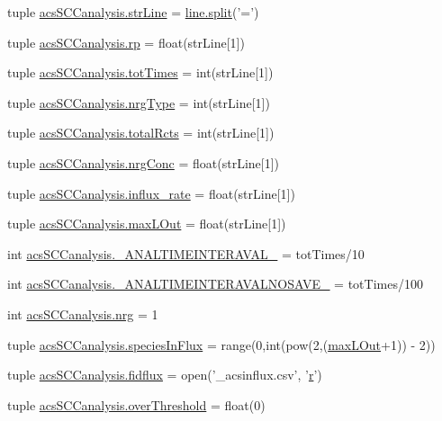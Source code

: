 \begin{DoxyCompactItemize}
\item 
tuple \hyperlink{a00130_a072631e11db72789389935b0f9efff8d}{acs\+S\+C\+Canalysis.\+str\+Line} = \hyperlink{a00059_a4d1aa74fac80ae0275c056575fdb6626}{line.\+split}('=')
\item 
tuple \hyperlink{a00130_a98150f532e09ebae495212500d2f1799}{acs\+S\+C\+Canalysis.\+rp} = float(str\+Line\mbox{[}1\mbox{]})
\item 
tuple \hyperlink{a00130_a20df40e09bc9514382d71f15783c7856}{acs\+S\+C\+Canalysis.\+tot\+Times} = int(str\+Line\mbox{[}1\mbox{]})
\item 
tuple \hyperlink{a00130_a0d0c83fd90489be59b1f5a31dadf4469}{acs\+S\+C\+Canalysis.\+nrg\+Type} = int(str\+Line\mbox{[}1\mbox{]})
\item 
tuple \hyperlink{a00130_a9f0e87ff21f3597668f5ad076224da87}{acs\+S\+C\+Canalysis.\+total\+Rcts} = int(str\+Line\mbox{[}1\mbox{]})
\item 
tuple \hyperlink{a00130_a24d5f5a61d56c596017396ad272ef4a4}{acs\+S\+C\+Canalysis.\+nrg\+Conc} = float(str\+Line\mbox{[}1\mbox{]})
\item 
tuple \hyperlink{a00130_a3a8adee26325d72aca909e91b0fd3ea5}{acs\+S\+C\+Canalysis.\+influx\+\_\+rate} = float(str\+Line\mbox{[}1\mbox{]})
\item 
tuple \hyperlink{a00130_a47da7b9153a0e4a33512f6d2675b8c1a}{acs\+S\+C\+Canalysis.\+max\+L\+Out} = float(str\+Line\mbox{[}1\mbox{]})
\item 
int \hyperlink{a00130_a46f1fb71bdcdb1c8679ae847d0d4b63f}{acs\+S\+C\+Canalysis.\+\_\+\+A\+N\+A\+L\+T\+I\+M\+E\+I\+N\+T\+E\+R\+A\+V\+A\+L\+\_\+} = tot\+Times/10
\item 
int \hyperlink{a00130_a7665e828ed7f27f4ba353e9645ad716d}{acs\+S\+C\+Canalysis.\+\_\+\+A\+N\+A\+L\+T\+I\+M\+E\+I\+N\+T\+E\+R\+A\+V\+A\+L\+N\+O\+S\+A\+V\+E\+\_\+} = tot\+Times/100
\item 
int \hyperlink{a00130_a948683f966c62ac856582281c3cda1f4}{acs\+S\+C\+Canalysis.\+nrg} = 1
\item 
tuple \hyperlink{a00130_a36f6b63269e716f42cd38a36a781a4cf}{acs\+S\+C\+Canalysis.\+species\+In\+Flux} = range(0,int(pow(2,(\hyperlink{a00113_abb126c97fed10420e64f85923bf5e04b}{max\+L\+Out}+1)) -\/ 2))
\item 
tuple \hyperlink{a00130_a0c40e4d9928e8df792b31c7a431d3fba}{acs\+S\+C\+Canalysis.\+fidflux} = open('\+\_\+acsinflux.\+csv', '\hyperlink{a00031_ac862e7284527eb913b1351c8bfb8e079}{r}')
\item 
tuple \hyperlink{a00130_a12e61f8d7aadb52256a7728af342bae3}{acs\+S\+C\+Canalysis.\+over\+Threshold} = float(0)

\end{DoxyCompactItemize}
